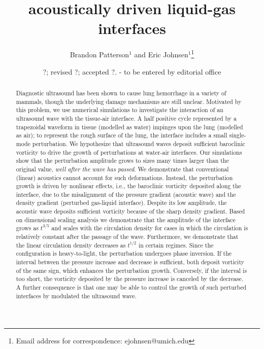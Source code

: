 \documentclass{jfm}%
\title[acoustically driven interfaces]{acoustically driven liquid-gas interfaces}
\author[B. Patterson and E. Johnsen]%
{Brandon Patterson$^1$ and %
Eric Johnsen$^1$\thanks{Email address for correspondence: ejohnsen@umich.edu}\ns
}
\affiliation{$^1$Department of Mechanical Engineering, University of Michigan,
Ann Arbor, MI 48109, USA}
\date{?; revised ?; accepted ?. - to be entered by editorial office}
\begin{document}
\maketitle

\begin{acronym}
\end{acronym}

\begin{abstract}
  Diagnostic ultrasound has been shown to cause lung hemorrhage in a
  variety of mammals, though the underlying damage mechanisms are
  still unclear. Motivated by this problem, we use numerical
  simulations to investigate the interaction of an ultrasound wave
  with the tissue-air interface. A half positive cycle represented by
  a trapezoidal waveform in tissue (modelled as water) impinges upon
  the lung (modelled as air); to represent the rough surface of the
  lung, the interface includes a small single-mode perturbation. We
  hypothesize that ultrasound waves deposit sufficient baroclinic
  vorticity to drive the growth of perturbations at water-air
  interfaces. Our simulations show that the perturbation amplitude
  grows to sizes many times larger than the original value, \emph{well
    after the wave has passed}. We demonstrate that conventional
  (linear) acoustics cannot account for such deformations. Instead,
  the perturbation growth is driven by nonlinear effects, i.e., the
  baroclinic vorticity deposited along the interface, due to the
  misalignment of the pressure gradient (acoustic wave) and the
  density gradient (perturbed gas-liquid interface). Despite its low
  amplitude, the acoustic wave deposits sufficient vorticity because
  of the sharp density gradient. Based on dimensional scaling analysis
  we demonstrate that the amplitude of the interface grows as
  $t^{3/5}$ and scales with the circulation density for cases in which
  the circulation is relatively constant after the passage of the
  wave. Furthermore, we demonstrate that the linear circulation
  density decreases as $t^{1/2}$ in certain regimes. Since the
  configuration is heavy-to-light, the perturbation undergoes phase
  inversion. If the interval between the pressure increase and
  decrease is sufficient, both deposit vorticity of the same sign,
  which enhances the perturbation growth. Conversely, if the interval
  is too short, the vorticity deposited by the pressure increase is
  canceled by the decrease. A further consequence is that one may be
  able to control the growth of such perturbed interfaces by modulated
  the ultrasound wave.
\end{abstract}
\end{document}
